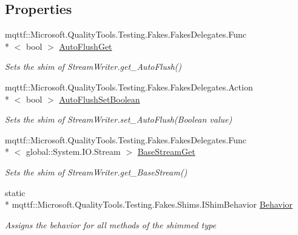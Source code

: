\subsection*{Properties}
\begin{DoxyCompactItemize}
\item 
mqttf\-::\-Microsoft.\-Quality\-Tools.\-Testing.\-Fakes.\-Fakes\-Delegates.\-Func\\*
$<$ bool $>$ \hyperlink{class_system_1_1_i_o_1_1_fakes_1_1_shim_stream_writer_a555eb0af0621a8370813134f2cfd4fb6}{Auto\-Flush\-Get}
\begin{DoxyCompactList}\small\item\em Sets the shim of Stream\-Writer.\-get\-\_\-\-Auto\-Flush()\end{DoxyCompactList}\item 
mqttf\-::\-Microsoft.\-Quality\-Tools.\-Testing.\-Fakes.\-Fakes\-Delegates.\-Action\\*
$<$ bool $>$ \hyperlink{class_system_1_1_i_o_1_1_fakes_1_1_shim_stream_writer_abfad4353c768f7698301971f38a19ae0}{Auto\-Flush\-Set\-Boolean}
\begin{DoxyCompactList}\small\item\em Sets the shim of Stream\-Writer.\-set\-\_\-\-Auto\-Flush(\-Boolean value)\end{DoxyCompactList}\item 
mqttf\-::\-Microsoft.\-Quality\-Tools.\-Testing.\-Fakes.\-Fakes\-Delegates.\-Func\\*
$<$ global\-::\-System.\-I\-O.\-Stream $>$ \hyperlink{class_system_1_1_i_o_1_1_fakes_1_1_shim_stream_writer_a8a4f667581f1229d194ea435f17a70eb}{Base\-Stream\-Get}
\begin{DoxyCompactList}\small\item\em Sets the shim of Stream\-Writer.\-get\-\_\-\-Base\-Stream()\end{DoxyCompactList}\item 
static \\*
mqttf\-::\-Microsoft.\-Quality\-Tools.\-Testing.\-Fakes.\-Shims.\-I\-Shim\-Behavior \hyperlink{class_system_1_1_i_o_1_1_fakes_1_1_shim_stream_writer_a829be75c09be4fc4f0edd653b30a78b8}{Behavior}
\begin{DoxyCompactList}\small\item\em Assigns the behavior for all methods of the shimmed type\end{DoxyCompactList}\item 

\end{DoxyCompactItemize}
